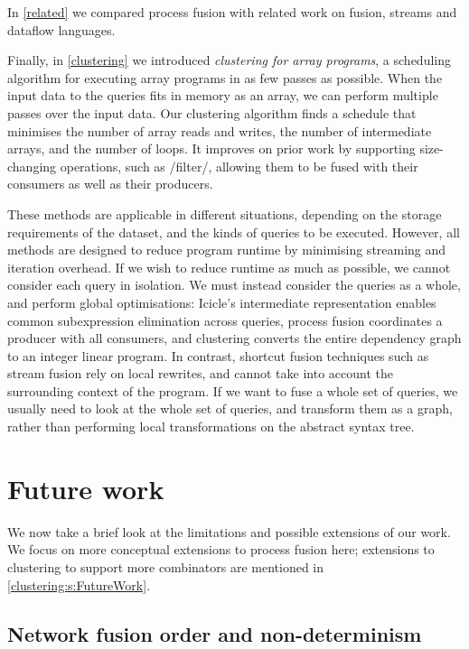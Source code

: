 In \cref{related} we compared process fusion with related work on fusion, streams and dataflow languages.

Finally, in \cref{clustering} we introduced \emph{clustering for array programs}, a scheduling algorithm for executing array programs in as few passes as possible.
When the input data to the queries fits in memory as an array, we can perform multiple passes over the input data.
Our clustering algorithm finds a schedule that minimises the number of array reads and writes, the number of intermediate arrays, and the number of loops.
It improves on prior work by supporting size-changing operations, such as \Hs/filter/, allowing them to be fused with their consumers as well as their producers.

These methods are applicable in different situations, depending on the storage requirements of the dataset, and the kinds of queries to be executed.
However, all methods are designed to reduce program runtime by minimising streaming and iteration overhead.
If we wish to reduce runtime as much as possible, we cannot consider each query in isolation.
We must instead consider the queries as a whole, and perform global optimisations: Icicle's intermediate representation enables common subexpression elimination across queries, process fusion coordinates a producer with all consumers, and clustering converts the entire dependency graph to an integer linear program.
In contrast, shortcut fusion techniques such as stream fusion \citep{coutts2007stream} rely on local rewrites, and cannot take into account the surrounding context of the program.
If we want to fuse a whole set of queries, we usually need to look at the whole set of queries, and transform them as a graph, rather than performing local transformations on the abstract syntax tree.

\section{Future work}
\label{related/future}

We now take a brief look at the limitations and possible extensions of our work.
We focus on more conceptual extensions to process fusion here; extensions to clustering to support more combinators are mentioned in \cref{clustering:s:FutureWork}.

\subsection{Network fusion order and non-determinism}

